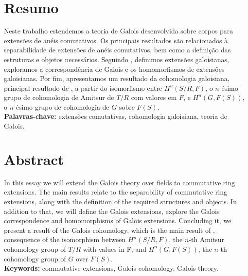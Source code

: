 \documentclass[12pt]{report}
\theoremstyle{definition}
\theoremstyle{remark}
\begin{document}
\chapter*{\center Resumo}
\noindent Neste trabalho estendemos a teoria de Galois desenvolvida sobre corpos para extensões de anéis comutativos. Os principais resultados são relacionados à separabilidade de extensões de anéis comutativos, bem como a definição das estruturas e objetos necessários. Seguindo \cite{chr}, definimos extensões galoisianas, exploramos a correspondência de Galois e os homomorfismos de extensões galoisianas. Por fim, apresentamos um resultado da cohomologia galoisiana, principal resultado de \cite{chr}, a partir do isomorfismo entre $H^n(S/R,F)$, o $n$-ésimo grupo de cohomologia de Amitsur de $T/R$ com valores em $F$, e $H^n(G,F(S))$, o $n$-ésimo grupo de cohomologia de $G$ sobre $F(S)$. \\[12pt]
\noindent \textbf{Palavras-chave: } extensões comutativas, cohomologia galoisiana, teoria de Galois.

\chapter*{\center Abstract}
\noindent In this essay we will extend the Galois theory over fields to commutative ring extensions. The main results relate to the separability of commutative ring extensions, along with the definition of the required structures and objects. In addition to that, we will define the Galois extensions, explore the Galois correspondence and homomorphisms of Galois extensions. Concluding it, we present a result of the Galois cohomology, which is the main result of \cite{chr}, consequence of the isomorphism between $H^n(S/R,F)$, the $n$-th Amitsur cohomology group of $T/R$ with values in F, and $H^n(G,F(S))$, the $n$-th cohomology group of $G$ over $F(S)$.\\[12pt]
\noindent \textbf{Keywords: } commutative extensions, Galois cohomology, Galois theory.

\tableofcontents
\end{document}
